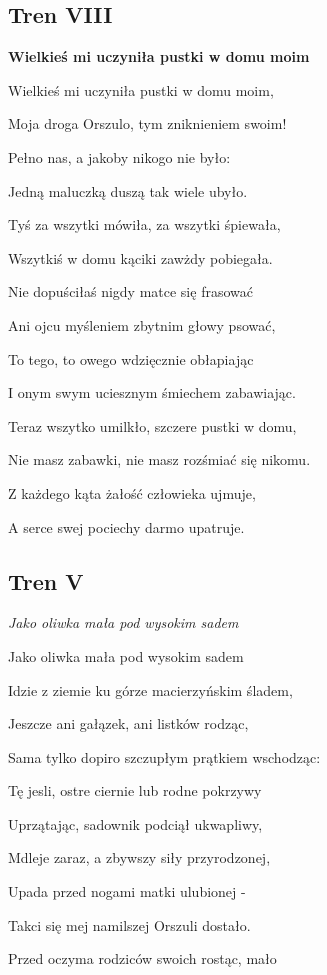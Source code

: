 \documentclass{article}
\begin{document}
\subsection{Tren VIII}

\textbf{Wielkieś mi uczyniła pustki w domu moim}

Wielkieś mi uczyniła pustki w domu moim,

Moja droga Orszulo, tym zniknieniem swoim!

Pełno nas, a jakoby nikogo nie było:

Jedną maluczką duszą tak wiele ubyło.

Tyś za wszytki mówiła, za wszytki śpiewała,

Wszytkiś w domu kąciki zawżdy pobiegała.

Nie dopuściłaś nigdy matce się frasować

Ani ojcu myśleniem zbytnim głowy psować,

To tego, to owego wdzięcznie obłapiając

I onym swym uciesznym śmiechem zabawiając.

Teraz wszytko umilkło, szczere pustki w domu,

Nie masz zabawki, nie masz rozśmiać się nikomu.

Z każdego kąta żałość człowieka ujmuje,

A serce swej pociechy darmo upatruje.

\subsection{Tren V}

\textit{Jako oliwka mała pod wysokim sadem}

Jako oliwka mała pod wysokim sadem

Idzie z ziemie ku górze macierzyńskim śladem,

Jeszcze ani gałązek, ani listków rodząc,

Sama tylko dopiro szczupłym prątkiem wschodząc:

Tę jesli, ostre ciernie lub rodne pokrzywy

Uprzątając, sadownik podciął ukwapliwy,

Mdleje zaraz, a zbywszy siły przyrodzonej,

Upada przed nogami matki ulubionej -

Takci się mej namilszej Orszuli dostało.

Przed oczyma rodziców swoich rostąc, mało
\end{document}
